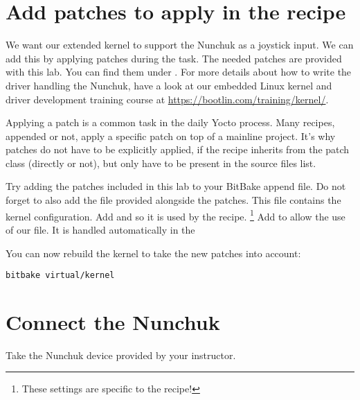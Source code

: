 \section{Add patches to apply in the recipe}

We want our extended 
kernel to support the Nunchuk as
a joystick input. We can add this by applying patches during the
 task. The needed patches are provided with this lab. You can
find them under . For more
details about how to write the driver handling the Nunchuk, have a look at our
embedded Linux kernel and driver development training course at
\url{https://bootlin.com/training/kernel/}.

Applying a patch is a common task in the daily Yocto process. Many recipes,
appended or not, apply a specific patch on top of a mainline project. It's why
patches do not have to be explicitly applied, if the recipe inherits from the
patch class (directly or not), but only have to be present in the source files
list.

Try adding the patches included in this lab to your BitBake append
file. Do not forget to also add the  file provided
alongside the patches. This file contains the kernel configuration.
\if{}
Add  and  so it is used by the  recipe.
\footnote{These settings are specific to the  recipe!}
\fi
\if{}
Add  to allow the use of our  file.
\else
It is handled automatically in the 
\fi

You can now rebuild the kernel to take the new patches into account:
\begin{verbatim}
bitbake virtual/kernel
\end{verbatim}

\section{Connect the Nunchuk}

Take the Nunchuk device provided by your instructor.

